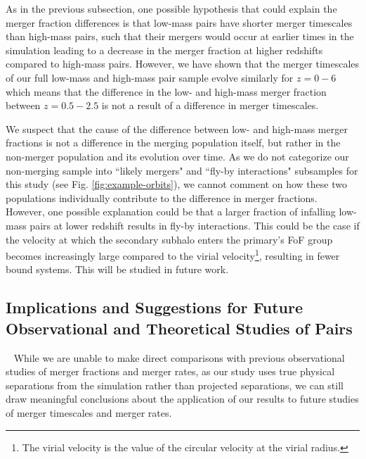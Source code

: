 \documentclass[twocolumn,linenumbers]{aastex631}
\begin{document}
        As in the previous subsection, one possible hypothesis that could explain the merger fraction differences is that low-mass pairs have shorter merger timescales than high-mass pairs, such that their mergers would occur at earlier times in the simulation leading to a decrease in the merger fraction at higher redshifts compared to high-mass pairs.
        However, we have shown that the merger timescales of our full low-mass and high-mass pair sample evolve similarly for $z=0-6$ which means that the difference in the low- and high-mass merger fraction between $z=0.5-2.5$ is not a result of a difference in merger timescales.
    
        We suspect that the cause of the difference between low- and high-mass merger fractions is not a difference in the merging population itself, but rather in the non-merger population and its evolution over time. 
        As we do not categorize our non-merging sample into ``likely mergers" and ``fly-by interactions" subsamples for this study (see Fig. \ref{fig:example-orbits}), we cannot comment on how these two populations individually contribute to the difference in merger fractions.
        However, one possible explanation could be that a larger fraction of infalling low-mass pairs at lower redshift results in fly-by interactions. 
        This could be the case if the velocity at which the secondary subhalo enters the primary's FoF group becomes increasingly large compared to the virial velocity\footnote{The virial velocity is the value of the circular velocity at the virial radius.}, resulting in fewer bound systems. 
        This will be studied in future work.


        
    \subsection{Implications and Suggestions for Future Observational and Theoretical Studies of Pairs}~\label{sec:disc-suggestions}
        While we are unable to make direct comparisons with previous observational studies of merger fractions and merger rates, as our study uses true physical separations from the simulation rather than projected separations, we can still draw meaningful conclusions about the application of our results to future studies of merger timescales and merger rates. 
    
\end{document}
